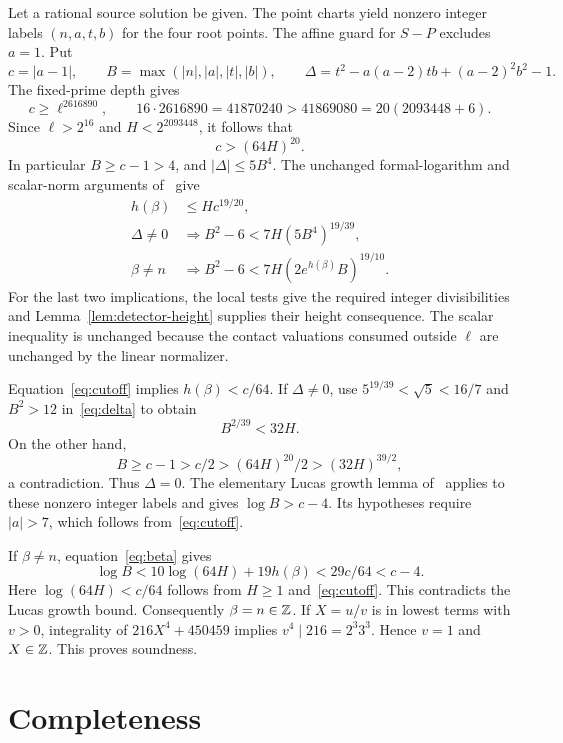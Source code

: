 \documentclass[11pt,a4paper]{article}
\begin{document}
Let a rational source solution be given. The point charts yield
nonzero integer labels $(n,a,t,b)$ for the four root points.
The affine guard for $S-P$ excludes $a=1$. Put
\[
 c=|a-1|,\qquad B=\max(|n|,|a|,|t|,|b|),
 \qquad\Delta=t^2-a(a-2)tb+(a-2)^2b^2-1.
\]
The fixed-prime depth gives
\[
 c\ge\ell^{2616890},\qquad
 16\cdot2616890=41870240>41869080=20(2093448+6).
\]
Since $\ell>2^{16}$ and $H<2^{2093448}$, it follows that
\begin{equation}\label{eq:cutoff}
                         c>(64H)^{20}.
\end{equation}
In particular $B\ge c-1>4$, and $|\Delta|\le5B^4$.
The unchanged formal-logarithm and scalar-norm arguments
of~\cite{Baseline} give
\begin{align}
 h(\beta)&\le Hc^{19/20},\label{eq:betaheight}\\
 \Delta\ne0&\Longrightarrow
 B^2-6<7H(5B^4)^{19/39},\label{eq:delta}\\
 \beta\ne n&\Longrightarrow
 B^2-6<7H(2e^{h(\beta)}B)^{19/10}.\label{eq:beta}
\end{align}
For the last two implications, the local tests give the required
integer divisibilities and Lemma~\ref{lem:detector-height}
supplies their height consequence. The scalar inequality is
unchanged because the contact valuations consumed outside $\ell$
are unchanged by the linear normalizer.

Equation~\eqref{eq:cutoff} implies $h(\beta)<c/64$.
If $\Delta\ne0$, use $5^{19/39}<\sqrt5<16/7$ and
$B^2>12$ in~\eqref{eq:delta} to obtain
\[
                        B^{2/39}<32H.
\]
On the other hand,
\[
 B\ge c-1>c/2>(64H)^{20}/2>(32H)^{39/2},
\]
a contradiction. Thus $\Delta=0$.
The elementary Lucas growth lemma of~\cite{Baseline} applies
to these nonzero integer labels and gives $\log B>c-4$.
Its hypotheses require $|a|>7$, which follows from~\eqref{eq:cutoff}.

If $\beta\ne n$, equation~\eqref{eq:beta} gives
\[
 \log B<10\log(64H)+19h(\beta)
            <29c/64<c-4.
\]
Here $\log(64H)<c/64$ follows from $H\ge1$
and~\eqref{eq:cutoff}. This contradicts the Lucas growth bound.
Consequently $\beta=n\in\mathbb Z$.
If $X=u/v$ is in lowest terms with $v>0$, integrality of
$216X^4+450459$ implies $v^4\mid216=2^3 3^3$.
Hence $v=1$ and $X\in\mathbb Z$. This proves soundness.

\section{Completeness}
\end{document}
